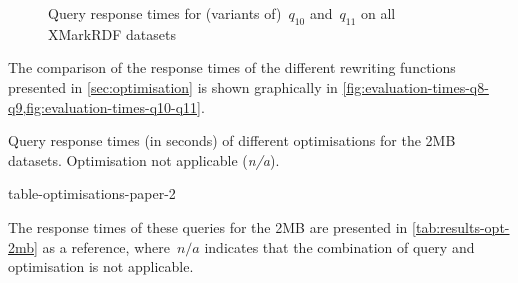 \begin{figure*}[t]\scriptsize
  \centering
  \hspace{8pt}

  \hspace{8pt}

  \hspace{8pt}
  \caption{Query response times for (variants of)~$q_{10}$ and~$q_{11}$ on all XMarkRDF datasets}
  \label{fig:evaluation-times-q10-q11} 
\end{figure*}

The comparison of the response times of the different rewriting functions presented in \cref{sec:optimisation} is
shown graphically in \cref{fig:evaluation-times-q8-q9,fig:evaluation-times-q10-q11}.
%
\begin{table*}[t]
  \caption[Query response times (in seconds) of different optimisations for the 2MB datasets.]{Query response times (in seconds) of different optimisations for the 2MB datasets. Optimisation not applicable (\textit{n/a}).}
  \label{tab:results-opt-2mb}
  \centering
  {table-optimisations-paper-2}
\end{table*}
%
The response times of these queries for the 2MB are presented in \cref{tab:results-opt-2mb} as a reference,
where~$\textit{n/a}$ indicates that the combination of query and optimisation is not applicable.





